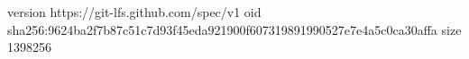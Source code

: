 version https://git-lfs.github.com/spec/v1
oid sha256:9624ba2f7b87c51c7d93f45eda921900f607319891990527e7e4a5c0ca30affa
size 1398256
